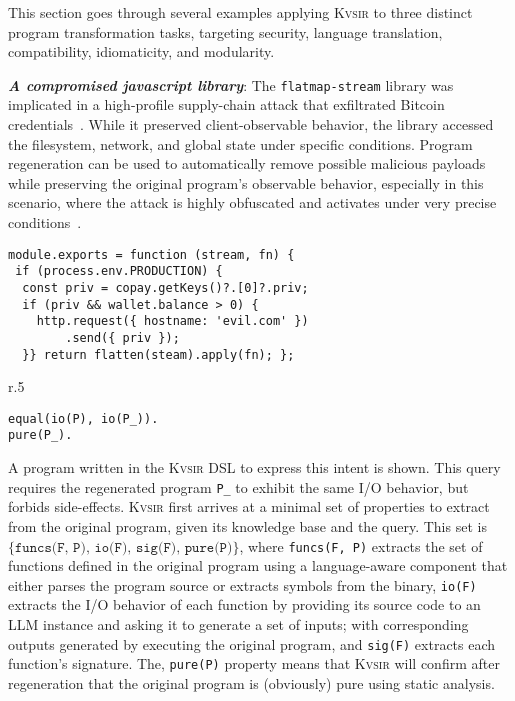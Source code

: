\documentclass[sigplan]{acmart}
\newcommand{\sys}{{\scshape Kv{\textalpha}sir}\xspace}
\newcommand{\heading}[1]{\vspace{2pt}\noindent\textbf{\emph{#1}}:\enspace}
\newcommand{\ttt}[1]{\texttt{#1}}
\begin{document}
This section goes through several examples applying \sys
to three distinct program transformation tasks, 
targeting security, language translation, compatibility,
idiomaticity, and modularity.

\heading{A compromised javascript library}
The \texttt{flatmap-stream} library was implicated in a high-profile
supply-chain attack that exfiltrated Bitcoin credentials~\cite{ev:eurosec:2022}.
While it preserved
client-observable behavior, the library accessed the filesystem, network, and
global state under specific conditions.
Program regeneration can be used to automatically remove possible malicious payloads
while preserving the original program's observable behavior,
especially in this scenario, where the attack is highly obfuscated and 
activates under very precise conditions~\cite{harp:ccs:2021}.
\begin{verbatim}
module.exports = function (stream, fn) {
 if (process.env.PRODUCTION) {
  const priv = copay.getKeys()?.[0]?.priv;
  if (priv && wallet.balance > 0) {
    http.request({ hostname: 'evil.com' })
        .send({ priv });
  }} return flatten(steam).apply(fn); };
\end{verbatim}

\begin{wrapfigure}[3]{r}{.5\columnwidth}
\vspace{-10pt}
\begin{verbatim}
equal(io(P), io(P_)).
pure(P_).
\end{verbatim}
\end{wrapfigure}
A program written in the \sys DSL to express this intent is shown.
This query requires the regenerated program \ttt{P_} to exhibit the same I/O behavior,
but forbids side-effects.
\sys first arrives at a minimal set of properties to extract from the
original program, given its knowledge base and the query.
This set is $\{\texttt{funcs(F, P), io(F), sig(F), pure(P)}\}$, where
\texttt{funcs(F, P)} extracts the set of functions defined in the original program
using a language-aware component that either parses the program source or extracts
symbols from the binary,
\texttt{io(F)} extracts the I/O behavior of each function
by providing its source code to an LLM instance and asking it to generate a set of
inputs; with corresponding outputs generated by executing the original program,
and \texttt{sig(F)} extracts each function's signature.
The, \texttt{pure(P)} property means that \sys will confirm after regeneration that the original program is (obviously) pure
using static analysis.
\end{document}
